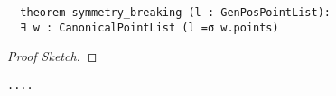 \begin{lstlisting}
  theorem symmetry_breaking (l : GenPosPointList):
  ∃ w : CanonicalPointList (l =σ w.points)
\end{lstlisting}


\begin{proof}[Proof Sketch]
\end{proof}


\begin{lstlisting}
....

\end{lstlisting}
